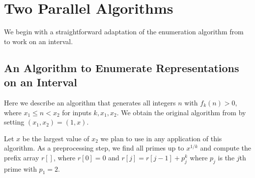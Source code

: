 \documentclass[11pt]{amsart}
\numberwithin{equation}{section}
\numberwithin{algorithm}{section}
\begin{document}






\section{Two Parallel Algorithms}\label{sec:alg}
%

We begin with a straightforward adaptation of the
enumeration algorithm from \cite{OSS2024} to work on an
interval.

\subsection{An Algorithm to Enumerate Representations on an Interval}

    Here we describe an algorithm that generates all integers $n$
    with $f_k(n)>0$, where $x_1\le n < x_2$ for inputs $k,x_1,x_2$.
    We obtain the original algorithm from \cite{OSS2024} by
    setting $(x_1,x_2)=(1,x)$.

    Let $x$ be the largest value of $x_2$ we plan to use in any application of this algorithm.  
    As a preprocessing step, we find all primes up to $x^{1/k}$ and compute the prefix array $r[]$, where $r[0]=0$ and $r[j]=r[j-1]+p_j^k$ where $p_j$ is the $j$th prime with $p_1=2$.
\end{document}
